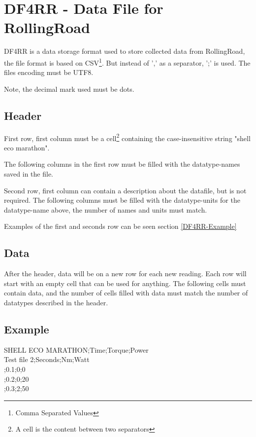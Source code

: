\section{DF4RR - Data File for RollingRoad}

DF4RR is a data storage format used to store collected data from RollingRoad, the file format is based on CSV\footnote{Comma Separated Values}\cite{CSVFileDescription}. But instead of ',' as a separator, ';' is used. The files encoding must be UTF8\cite{UTF8Description}.

Note, the decimal mark used must be dots.

\subsection{Header}

First row, first column must be a cell\footnote{A cell is the content between two separators} containing the case-insensitive string "shell eco marathon".

The following columns in the first row must be filled with the datatype-names saved in the file.

Second row, first column can contain a description about the datafile, but is not required. The following columns must be filled with the datatype-units for the datatype-name above, the number of names and units must match. 

Examples of the first and seconds row can be seen section \vref{DF4RR-Example}

\subsection{Data}

After the header, data will be on a new row for each new reading. Each row will start with an empty cell that can be used for anything. The following cells must contain data, and the number of cells filled with data must match the number of datatypes described in the header. 

\subsection{Example}
\label{DF4RR-Example}

SHELL ECO MARATHON;Time;Torque;Power\\
Test file 2;Seconds;Nm;Watt\\
;0.1;0;0\\
;0.2;0;20\\
;0.3;2;50\\
